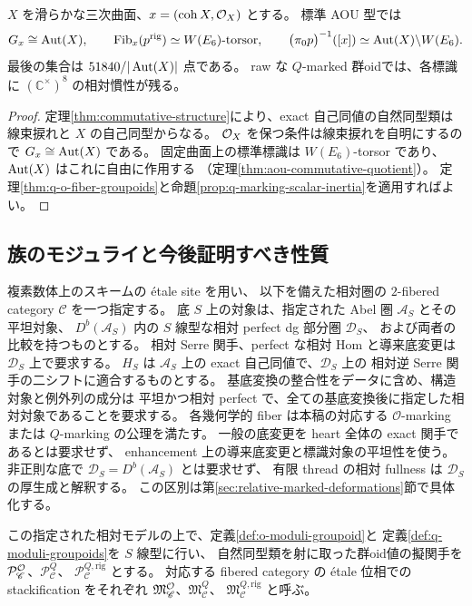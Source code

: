 \begin{proposition}[可換三次曲面での検算]\label{prop:commutative-q-o-fibers}
$X$ を滑らかな三次曲面、$x=(\operatorname{coh}X,\mathcal O_X)$ とする。
標準 AOU 型では
\[
 G_x\cong\operatorname{Aut}(X),\qquad
 \operatorname{Fib}_x(p^{\mathrm{rig}})\simeq W(E_6)\text{-torsor},\qquad
 \bigl(\pi_0p\bigr)^{-1}([x])\simeq\operatorname{Aut}(X)\backslash W(E_6).
\]
最後の集合は $51840/|\operatorname{Aut}(X)|$ 点である。
raw な $Q$-marked 群oidでは、各標識に $(\mathbb C^\times)^8$ の相対慣性が残る。
\end{proposition}
\begin{proof}
定理\ref{thm:commutative-structure}により、exact 自己同値の自然同型類は
線束捩れと $X$ の自己同型からなる。
$\mathcal O_X$ を保つ条件は線束捩れを自明にするので $G_x\cong\operatorname{Aut}(X)$ である。
固定曲面上の標準標識は $W(E_6)$-torsor であり、$\operatorname{Aut}(X)$ はこれに自由に作用する
（定理\ref{thm:aou-commutative-quotient}）。
定理\ref{thm:q-o-fiber-groupoids}と命題\ref{prop:q-marking-scalar-inertia}を適用すればよい。
\end{proof}

\subsection{族のモジュライと今後証明すべき性質}

\begin{definition}[許容相対モデルからのモジュライ]
\label{def:relative-marked-moduli}
複素数体上のスキームの \'etale site を用い、
以下を備えた相対圏の $2$-fibered category $\mathscr C$ を一つ指定する。
底 $S$ 上の対象は、指定された Abel 圏 $\mathcal A_S$ とその平坦対象、
$D^b(\mathcal A_S)$ 内の $S$ 線型な相対 perfect dg 部分圏 $\mathcal D_S$、
および両者の比較を持つものとする。
相対 Serre 関手、perfect な相対 Hom と導来底変更は $\mathcal D_S$ 上で要求する。
$H_S$ は $\mathcal A_S$ 上の exact 自己同値で、$\mathcal D_S$ 上の
相対逆 Serre 関手の二シフトに適合するものとする。
基底変換の整合性をデータに含め、構造対象と例外列の成分は
平坦かつ相対 perfect で、全ての基底変換後に指定した相対対象であることを要求する。
各幾何学的 fiber は本稿の対応する $\mathcal O$-marking または $Q$-marking の公理を満たす。
一般の底変更を heart 全体の exact 関手であるとは要求せず、
enhancement 上の導来底変更と標識対象の平坦性を使う。
非正則な底で $\mathcal D_S=D^b(\mathcal A_S)$ とは要求せず、
有限 thread の相対 fullness は $\mathcal D_S$ の厚生成と解釈する。
この区別は第\ref{sec:relative-marked-deformations}節で具体化する。

この指定された相対モデルの上で、定義\ref{def:o-moduli-groupoid}と
定義\ref{def:q-moduli-groupoids}を $S$ 線型に行い、
自然同型類を射に取った群oid値の擬関手を
$\mathcal P^{\mathcal O}_{\mathscr C}$、$\mathcal P^Q_{\mathscr C}$、
$\mathcal P^{Q,\mathrm{rig}}_{\mathscr C}$ とする。
対応する fibered category の \'etale 位相での stackification をそれぞれ
$\mathfrak M^{\mathcal O}_{\mathscr C}$、$\mathfrak M^Q_{\mathscr C}$、
$\mathfrak M^{Q,\mathrm{rig}}_{\mathscr C}$ と呼ぶ。
\end{definition}


